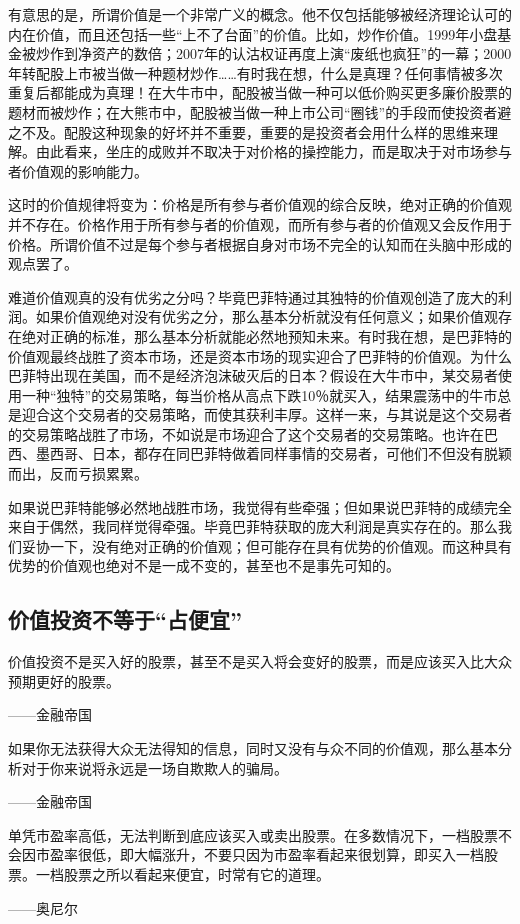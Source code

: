 有意思的是，所谓价值是一个非常广义的概念。他不仅包括能够被经济理论认可的内在价值，而且还包括一些“上不了台面”的价值。比如，炒作价值。1999年小盘基金被炒作到净资产的数倍；2007年的认沽权证再度上演“废纸也疯狂”的一幕；2000年转配股上市被当做一种题材炒作……有时我在想，什么是真理？任何事情被多次重复后都能成为真理！在大牛市中，配股被当做一种可以低价购买更多廉价股票的题材而被炒作；在大熊市中，配股被当做一种上市公司“圈钱”的手段而使投资者避之不及。配股这种现象的好坏并不重要，重要的是投资者会用什么样的思维来理解。由此看来，坐庄的成败并不取决于对价格的操控能力，而是取决于对市场参与者价值观的影响能力。

这时的价值规律将变为：价格是所有参与者价值观的综合反映，绝对正确的价值观并不存在。价格作用于所有参与者的价值观，而所有参与者的价值观又会反作用于价格。所谓价值不过是每个参与者根据自身对市场不完全的认知而在头脑中形成的观点罢了。

难道价值观真的没有优劣之分吗？毕竟巴菲特通过其独特的价值观创造了庞大的利润。如果价值观绝对没有优劣之分，那么基本分析就没有任何意义；如果价值观存在绝对正确的标准，那么基本分析就能必然地预知未来。有时我在想，是巴菲特的价值观最终战胜了资本市场，还是资本市场的现实迎合了巴菲特的价值观。为什么巴菲特出现在美国，而不是经济泡沫破灭后的日本？假设在大牛市中，某交易者使用一种“独特”的交易策略，每当价格从高点下跌10％就买入，结果震荡中的牛市总是迎合这个交易者的交易策略，而使其获利丰厚。这样一来，与其说是这个交易者的交易策略战胜了市场，不如说是市场迎合了这个交易者的交易策略。也许在巴西、墨西哥、日本，都存在同巴菲特做着同样事情的交易者，可他们不但没有脱颖而出，反而亏损累累。

如果说巴菲特能够必然地战胜市场，我觉得有些牵强；但如果说巴菲特的成绩完全来自于偶然，我同样觉得牵强。毕竟巴菲特获取的庞大利润是真实存在的。那么我们妥协一下，没有绝对正确的价值观；但可能存在具有优势的价值观。而这种具有优势的价值观也绝对不是一成不变的，甚至也不是事先可知的。

\subsection{价值投资不等于“占便宜”}

{\kaishu
价值投资不是买入好的股票，甚至不是买入将会变好的股票，而是应该买入比大众预期更好的股票。

\hfill ——金融帝国

如果你无法获得大众无法得知的信息，同时又没有与众不同的价值观，那么基本分析对于你来说将永远是一场自欺欺人的骗局。

\hfill ——金融帝国

单凭市盈率高低，无法判断到底应该买入或卖出股票。在多数情况下，一档股票不会因市盈率很低，即大幅涨升，不要只因为市盈率看起来很划算，即买入一档股票。一档股票之所以看起来便宜，时常有它的道理。

\hfill ——奥尼尔
}

